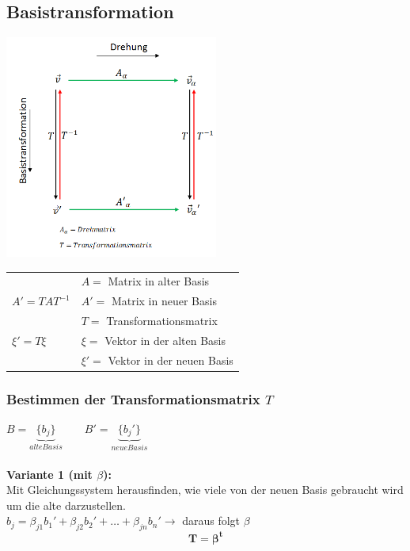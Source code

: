 \subsection{Basistransformation}
	\begin{minipage}{7cm}
		\includegraphics[width=7cm]{pics/2_Basistransformation.png}
	\end{minipage}
	\begin{minipage}{7cm}
		\begin{tabular}{ll}
			& $A =$ Matrix in alter Basis\\
			$A' = TAT^{-1}$ & $A' =$ Matrix in neuer Basis\\
			& $T =$ Transformationsmatrix\\
			$\xi' = T\xi$& $\xi =$ Vektor in der alten Basis\\
			& $\xi' =$ Vektor in der neuen Basis
		\end{tabular}
	\end{minipage}

	\subsubsection{Bestimmen der Transformationsmatrix $T$}
		$B = \underbrace{\lbrace b_j \rbrace}_{alte Basis} \qquad B' = \underbrace{\lbrace b_j' \rbrace}_{neue Basis}$\\ \\

		\textbf{Variante 1 (mit $\beta$):}\\
		Mit Gleichungssystem herausfinden, wie viele von der neuen Basis gebraucht wird um die alte darzustellen.\\
		$b_j = \beta_{j1}b_1' + \beta_{j2}b_2' + \ldots + \beta_{jn}b_n' \rightarrow$ daraus folgt $\beta$\\
		\begin{equation*}
			\mathbf{T = \beta^t}
		\end{equation*}

